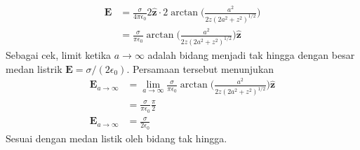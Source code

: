 \documentclass[../../../main.tex]{subfiles}
\begin{document}
\begin{align*}
    \mathbf{E}&=\frac{\sigma}{4\pi\epsilon_0} 2\boldsymbol{\hat{z}}\cdot2\arctan\biggl(\frac{a^2}{2z(2a^2+z^2)^{1/2}}\biggr)\\
    &=\frac{\sigma}{\pi\epsilon_0} \arctan\biggl(\frac{a^2}{2z(2a^2+z^2)^{1/2}}\biggr) \boldsymbol{\hat{z}}
\end{align*}
Sebagai cek, limit ketika $a\rightarrow\infty$ adalah bidang menjadi tak hingga dengan besar medan listrik $\mathbf{E}=\sigma/(2\epsilon_0)$. Persamaan tersebut menunjukan
\begin{align*}
    \mathbf{E}_{a\rightarrow\infty}&=\lim_{a\rightarrow\infty}\frac{\sigma}{\pi\epsilon_0} \arctan\biggl(\frac{a^2}{2z(2a^2+z^2)^{1/2}}\biggr) \boldsymbol{\hat{z}}\\
    &=\frac{\sigma}{\pi\epsilon_0} \frac{\pi}{2}\\
    \mathbf{E}_{a\rightarrow\infty}&=\frac{\sigma}{2\epsilon_0} 
\end{align*}
Sesuai dengan medan listik oleh bidang tak hingga.
\end{document}
